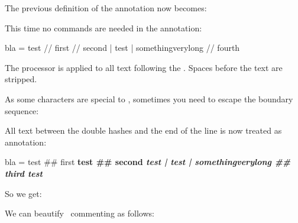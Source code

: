 \typebuffer[setup][option=TEX] \getbuffer[setup]

The previous definition of the annotation now becomes:

\startbuffer[setup]
\setuptyping
  [annotatedtyping]
  [escape=escape->{//,},
   color=darkblue]
\stopbuffer

\typebuffer[setup][option=TEX] \getbuffer[setup]

This time no commands are needed in the annotation:

\startbuffer[example]
\startannotatedtyping
bla = test               // first
                         // second
    | test
    | somethingverylong  // fourth
\stopannotatedtyping
\stopbuffer

\typebuffer[example][option=TEX]

The processor is applied to all text following the \type {//}. Spaces before the
text are stripped.

\starttextbackground[example]
    \getbuffer[example]
\stoptextbackground

As some characters are special to \TEX, sometimes you need to escape the boundary
sequence:

\startbuffer[setup]

\setuptyping
  [annotatedtyping]
  [escape=myescape->{\letterhash\letterhash,},
   color=darkgreen]
\stopbuffer

\typebuffer[setup][option=TEX] \getbuffer[setup]

All text between the double hashes and the end of the line is now treated as
annotation:

\startbuffer[example]
\startannotatedtyping
bla = test               ## first \bf test
                         ## second \sl test
    | test
    | somethingverylong  ## third \it test
\stopannotatedtyping
\stopbuffer

\typebuffer[example][option=TEX]

So we get:

\starttextbackground[example]
    \getbuffer[example]
\stoptextbackground

We can beautify \TEX\ commenting as follows:

\startbuffer[setup]

\setuptyping
  [annotatedtyping]
  [escape=comment->{\letterpercent\letterpercent,},
   color=darkblue]
\stopbuffer

